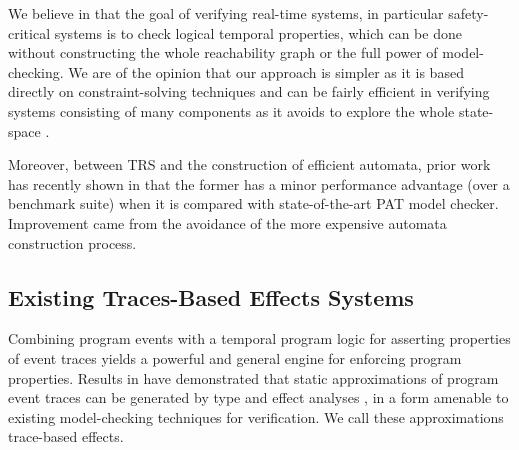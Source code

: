 \documentclass[acmsmall,10pt,review]{acmart}
\newcommand{\code}[1]{{\tt{\ensuremath{\m{#1}}}}}
\newcommand{\m}{\mathit}
\begin{document}
{{{We believe in that the goal of verifying real-time systems, in particular 
safety-critical systems is to check logical temporal properties, which can 
be done without constructing the whole reachability graph or the full power 
of model-checking. We are of the opinion that our approach is simpler as 
it is based directly on constraint-solving techniques and can be fairly 
efficient in verifying systems consisting of many components as it avoids 
to explore the whole state-space \cite{DBLP:conf/icfem/SongC20,DBLP:conf/forte/YiPD94}.


 
Moreover, between TRS and the construction of efficient automata, prior work has recently shown in \cite{DBLP:conf/icfem/SongC20} that the former has a minor performance advantage (over a benchmark suite) when it is compared with state-of-the-art PAT \cite{DBLP:conf/cav/SunLDP09} model checker.
Improvement came from the avoidance of the more expensive automata construction process.



\subsection{Existing Traces-Based Effects Systems} 



Combining program events with a temporal program logic for asserting properties of event traces yields a powerful and general engine for enforcing program properties. Results in \cite{DBLP:journals/jfp/SkalkaSH08,DBLP:conf/aplas/SkalkaS04,DBLP:conf/aplas/MarriottSS03} have demonstrated that static approximations of program event traces can be generated by type and effect analyses \cite{DBLP:journals/iandc/TalpinJ94,DBLP:books/daglib/0098135}, in a form amenable to existing model-checking techniques for verification. We call these approximations trace-based effects.

}}}
\end{document}
